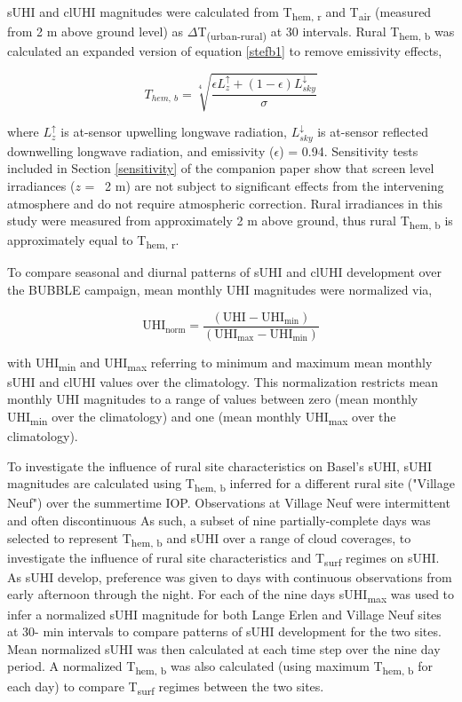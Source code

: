 \begin{bibunit}
sUHI and clUHI magnitudes were calculated from T\textsubscript{hem, r} and T\textsubscript{air} (measured from 2 \si{\meter} above ground level) as $\Delta$T\textsubscript{(urban-rural)} at 30 \si{\min} intervals. Rural T\textsubscript{hem, b} was calculated an expanded version of equation \ref{stefb1} to remove emissivity effects,

\begin{equation}
\label{ruralt}
T_{hem,~ b} = \sqrt[4]{\frac{\epsilon L_z^\uparrow + (1 - \epsilon)L_{sky}^\downarrow}{\sigma}}
\end{equation}

\noindent where $L_z^\uparrow$ is at-sensor upwelling longwave radiation, $L_{sky}^\downarrow$ is at-sensor reflected downwelling longwave radiation, and emissivity ($\epsilon$) = 0.94. Sensitivity tests included in Section \ref{sensitivity} of the companion paper show that screen level irradiances ($ z $ = ~2 \si{\meter}) are not subject to significant effects from the intervening atmosphere and do not require atmospheric correction. Rural irradiances in this study were measured from approximately 2 \si{\meter} above ground, thus rural T\textsubscript{hem, b} is approximately equal to T\textsubscript{hem, r}. 

To compare seasonal and diurnal patterns of sUHI and clUHI development over the BUBBLE campaign, mean monthly UHI magnitudes were normalized via,

\begin{equation}
\text{UHI}_{\text{norm}} = \frac{(\text{UHI} - \text{UHI}_{\text{min}})}{(\text{UHI}_{\text{max}} - \text{UHI}_{\text{min}})}
\label{uhinorm}
\end{equation}

\noindent with UHI\textsubscript{min} and UHI\textsubscript{max} referring to minimum and maximum mean monthly sUHI and clUHI values over the climatology. This normalization restricts mean monthly UHI magnitudes to a range of values between zero (mean monthly UHI\textsubscript{min} over the climatology) and one (mean monthly UHI\textsubscript{max} over the climatology).

To investigate the influence of rural site characteristics on Basel's sUHI, sUHI magnitudes are calculated using T\textsubscript{hem, b} inferred for a different rural site ("Village Neuf") over the summertime IOP. Observations at Village Neuf were intermittent and often discontinuous As such, a subset of nine partially-complete days was selected to represent T\textsubscript{hem, b} and sUHI over a range of cloud coverages, to investigate the influence of rural site characteristics and T\textsubscript{surf} regimes on sUHI. As sUHI develop, preference was given to days with continuous observations from early afternoon through the night. For each of the nine days sUHI\textsubscript{max} was used to infer a normalized sUHI magnitude for both Lange Erlen and Village Neuf sites at 30- \si{\minute} intervals to compare patterns of sUHI development for the two sites. Mean normalized sUHI was then calculated at each time step over the nine day period. A normalized T\textsubscript{hem, b} was also calculated (using maximum T\textsubscript{hem, b} for each day) to compare T\textsubscript{surf} regimes between the two sites.


\end{bibunit}
